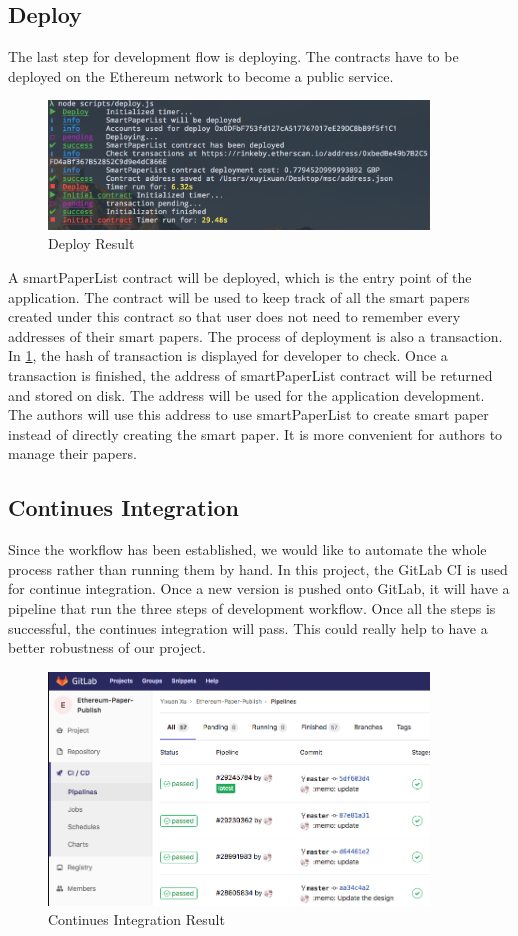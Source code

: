\documentclass[openany,12pt]{ecsthesis}      %
\begin{document}
\subsection{Deploy}
The last step for development flow is deploying. 
The contracts have to be deployed on the Ethereum network to become a public service.
\begin{figure}[H]
  \centering
  \includegraphics[width=0.9\textwidth]{deploy.png}
  \caption{Deploy Result}
  \label{deploy} 
\end{figure}
A smartPaperList contract will be deployed, which is the entry point of the application.
The contract will be used to keep track of 
all the smart papers created under this contract 
so that user does not need to remember every addresses of their smart papers. 
The process of deployment is also a transaction. 
In \ref{deploy}, the hash of transaction is displayed for developer to check. 
Once a transaction is finished, 
the address of smartPaperList contract will be returned and stored on disk. 
The address will be used for the application development. 
The authors will use this address to use smartPaperList to create smart paper instead of directly creating the smart paper.
It is more convenient for authors to manage their papers.
\subsection{Continues Integration}
Since the workflow has been established, we would like to automate the whole process rather than running them by hand.
In this project, the GitLab CI \cite{gitlab} is used for continue integration. 
Once a new version is pushed onto GitLab, 
it will have a pipeline that run the three steps of development workflow.
Once all the steps is successful, the continues integration will pass. 
This could really help to have a better robustness of our project.
\begin{figure}[H]
  \centering
  \includegraphics[width=0.9\textwidth]{ci.png}
  \caption{Continues Integration Result}
  \label{ci} 
\end{figure}
\end{document}
